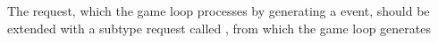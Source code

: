 The  request, which the game loop processes by generating
a  event, should be extended with a subtype request called
, from which the game loop generates